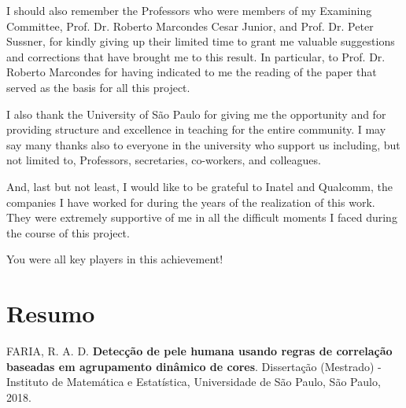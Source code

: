 \documentclass[11pt,twoside,a4paper]{book}
\theoremstyle{plain}
\theoremstyle{definition}
\begin{document}
I should also remember the Professors who were members of my Examining Committee, Prof. Dr. Roberto Marcondes Cesar Junior, and Prof. Dr. Peter Sussner, for kindly giving up their limited time to grant me valuable suggestions and corrections that have brought me to this result. In particular, to Prof. Dr. Roberto Marcondes for having indicated to me the reading of the paper that served as the basis for all this project.

I also thank the University of São Paulo for giving me the opportunity and for providing structure and excellence in teaching for the entire community. I may say many thanks also to everyone in the university who support us including, but not limited to, Professors, secretaries, co-workers, and colleagues.

And, last but not least, I would like to be grateful to Inatel and Qualcomm, the companies I have worked for during the years of the realization of this work. They were extremely supportive of me in all the difficult moments I faced during the course of this project.

You were all key players in this achievement!


\chapter*{Resumo}

\noindent FARIA, R. A. D. \textbf{Detecção de pele humana usando regras de correlação baseadas em agrupamento dinâmico de cores}.
Dissertação (Mestrado) - Instituto de Matemática e Estatística,
Universidade de São Paulo, São Paulo, 2018.
\\
\end{document}
